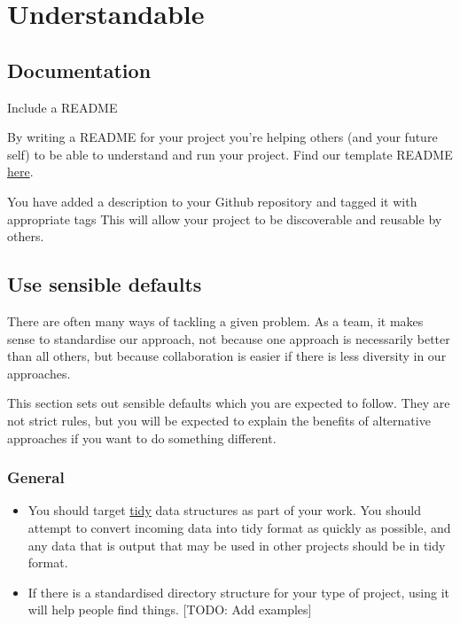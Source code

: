 \documentclass[]{book}
\providecommand{\tightlist}{%
  \setlength{\itemsep}{0pt}\setlength{\parskip}{0pt}}
\begin{document}
\hypertarget{understand}{%
\section{Understandable}\label{understand}}

\hypertarget{readme}{%
\subsection{Documentation}\label{readme}}

Include a README

By writing a README for your project you're helping others (and your future self) to be able to understand and run your project. Find our template README \href{https://github.com/moj-analytical-services/our-coding-standards/blob/master/README_template.md}{here}.

You have added a description to your Github repository and tagged it with appropriate tags This will allow your project to be discoverable and reusable by others.

\hypertarget{defaults}{%
\subsection{Use sensible defaults}\label{defaults}}

There are often many ways of tackling a given problem. As a team, it makes sense to standardise our approach, not because one approach is necessarily better than all others, but because collaboration is easier if there is less diversity in our approaches.

This section sets out sensible defaults which you are expected to follow. They are not strict rules, but you will be expected to explain the benefits of alternative approaches if you want to do something different.

\hypertarget{general}{%
\subsubsection*{General}\label{general}}

\begin{itemize}
\tightlist
\item
  You should target \href{http://vita.had.co.nz/papers/tidy-data.html}{tidy} data structures as part of your work. You should attempt to convert incoming data into tidy format as quickly as possible, and any data that is output that may be used in other projects should be in tidy format.
\item
  If there is a standardised directory structure for your type of project, using it will help people find things. {[}TODO: Add examples{]}
\end{itemize}
\end{document}
